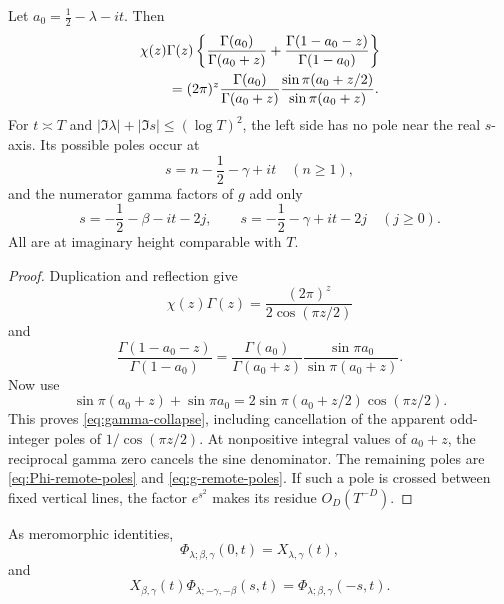 \begin{lemma}\label{lem:gamma-collapse}
Let $a_0=\frac12-\lambda-it$.  Then
\begin{align}
 &\chi(z)\Gamma(z)\left\{
 \frac{\Gamma(a_0)}{\Gamma(a_0+z)}
 +\frac{\Gamma(1-a_0-z)}{\Gamma(1-a_0)}\right\}
 \notag\\
 &\qquad=(2\pi)^z\frac{\Gamma(a_0)}{\Gamma(a_0+z)}
 \frac{\sin\pi(a_0+z/2)}{\sin\pi(a_0+z)}.
 \label{eq:gamma-collapse}
\end{align}
For $t\asymp T$ and $|\Im\lambda|+|\Im s|\leq(\log T)^2$, the left side
has no pole near the real $s$-axis.  Its possible poles occur at
\begin{equation}\label{eq:Phi-remote-poles}
 s=n-\frac12-\gamma+it\quad(n\geq1),
\end{equation}
and the numerator gamma factors of $g$ add only
\begin{equation}\label{eq:g-remote-poles}
 s=-\frac12-\beta-it-2j,\qquad
 s=-\frac12-\gamma+it-2j\quad(j\geq0).
\end{equation}
All are at imaginary height comparable with $T$.
\end{lemma}

\begin{proof}
Duplication and reflection give
\[
 \chi(z)\Gamma(z)=\frac{(2\pi)^z}{2\cos(\pi z/2)}
\]
and
\[
 \frac{\Gamma(1-a_0-z)}{\Gamma(1-a_0)}
 =\frac{\Gamma(a_0)}{\Gamma(a_0+z)}
 \frac{\sin\pi a_0}{\sin\pi(a_0+z)}.
\]
Now use
\[
 \sin\pi(a_0+z)+\sin\pi a_0
 =2\sin\pi(a_0+z/2)\cos(\pi z/2).
\]
This proves \eqref{eq:gamma-collapse}, including cancellation of the apparent
odd-integer poles of $1/\cos(\pi z/2)$.  At nonpositive integral values of
$a_0+z$, the reciprocal gamma zero cancels the sine denominator.  The
remaining poles are \eqref{eq:Phi-remote-poles} and
\eqref{eq:g-remote-poles}.  If such a pole is crossed between fixed vertical
lines, the factor $e^{s^2}$ makes its residue $O_D(T^{-D})$.
\end{proof}

\begin{lemma}\label{lem:arch-reflection}
As meromorphic identities,
\begin{equation}\label{eq:Phi-at-zero}
               \Phi_{\lambda;\beta,\gamma}(0,t)
               =X_{\lambda,\gamma}(t),
\end{equation}
and
\begin{equation}\label{eq:Phi-reflection}
 X_{\beta,\gamma}(t)
 \Phi_{\lambda;-\gamma,-\beta}(s,t)
 =\Phi_{\lambda;\beta,\gamma}(-s,t).
\end{equation}
\end{lemma}

